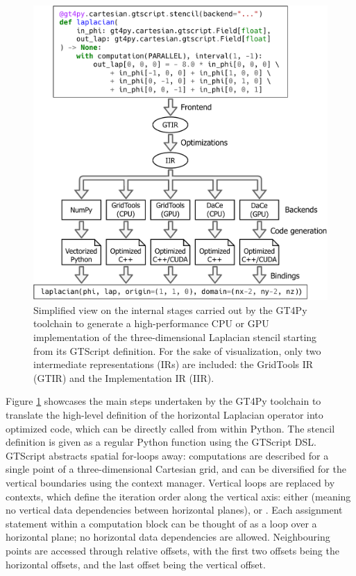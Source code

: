 \documentclass[gmd,manuscript,online]{copernicus}
\theoremstyle{theorem}
\theoremstyle{definition}
\theoremstyle{remark}
\theoremstyle{proposition}
\begin{document}
	\begin{figure}[t!]
		\centering
		\includegraphics[scale=0.5]{gt4py_3.pdf}
		\caption{Simplified view on the internal stages carried out by the GT4Py toolchain to generate a high-performance CPU or GPU implementation of the three-dimensional Laplacian stencil starting from its GTScript definition. For the sake of visualization, only two intermediate representations (IRs) are included: the GridTools IR (GTIR) and the Implementation IR (IIR). }
		\label{fig:gt4py}
	\end{figure}

	Figure \ref{fig:gt4py} showcases the main steps undertaken by the GT4Py toolchain to translate the high-level definition of the horizontal Laplacian operator into optimized code, which can be directly called from within Python. The stencil definition is given as a regular Python function using the GTScript DSL. GTScript abstracts spatial for-loops away: computations are described for a single point of a three-dimensional Cartesian grid, and can be diversified for the vertical boundaries using the  context manager. Vertical loops are replaced by  contexts, which define the iteration order along the vertical axis: either  (meaning no vertical data dependencies between horizontal planes),  or . Each assignment statement within a computation block can be thought of as a loop over a horizontal plane; no horizontal data dependencies are allowed. Neighbouring points are accessed through relative offsets, with the first two offsets being the horizontal offsets, and the last offset being the vertical offset.
\end{document}
